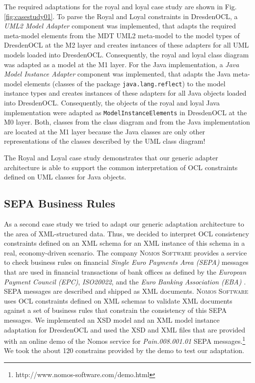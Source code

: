 The required adaptations for the royal and loyal case study are shown in Fig. \ref{fig:casestudy01}.
To parse the Royal and Loyal constraints
in DresdenOCL, a \textit{UML2 Model Adapter} component was implemented, that 
adapts the required meta-model elements from the MDT UML2 meta-model to the model 
types of DresdenOCL at the M2 layer and creates instances of these adapters for all UML models 
loaded into DresdenOCL. 
Consequently, the royal and loyal class diagram was adapted as a model at the M1 layer.
For the Java implementation, a \textit{Java Model Instance Adapter} component was implemented,
that adapts the Java meta-model elements (classes of the package \texttt{java.lang.reflect})
to the model instance types and creates instances of these adapters for all Java objects
loaded into DresdenOCL. Consequently, the objects of the royal and loyal Java implementation
were adapted as \texttt{ModelInstanceElements} in DresdenOCL at the M0 layer. Both, classes from 
the class diagram and from the Java implementation are located at the M1 layer 
because the Java classes are only other representations of the classes described by the 
UML class diagram! 

The Royal and Loyal case study demonstrates that our generic adapter architecture is able to 
support the common interpretation of OCL constraints defined on UML classes for Java objects.


\subsection{SEPA Business Rules}

As a second case study we tried to adapt our generic adaptation architecture to the
area of XML-structured data. Thus, we decided to interpret OCL consistency constraints
defined on an XML schema for an XML instance of this schema in a real, economy-driven
scenario. The company \textsc{Nomos Software} provides a service to check business rules on
financial \textit{Single Euro Payments Area (SEPA)} messages that are 
used in financial transactions of bank offices as defined by the \textit{European
Payment Council (EPC)}, \textit{ISO20022}, and the \textit{Euro Banking Association (EBA)} \cite{spec:UNIFI,spec:EPC}. 
SEPA messages are described and shipped as XML documents.
\textsc{Nomos Software} uses OCL constraints defined on XML schemas
to validate XML documents against a set of business rules that constrain the consistency of
this SEPA messages. We implemented an XSD model and an XML model instance adaptation 
for DresdenOCL and used the XSD and XML files that are 
provided with an online demo of the Nomos service for \textit{Pain.008.001.01} SEPA 
messages.\footnote{http://www.nomos-software.com/demo.html}
We took the about 120 constrains provided by the demo to test our adaptation. 

